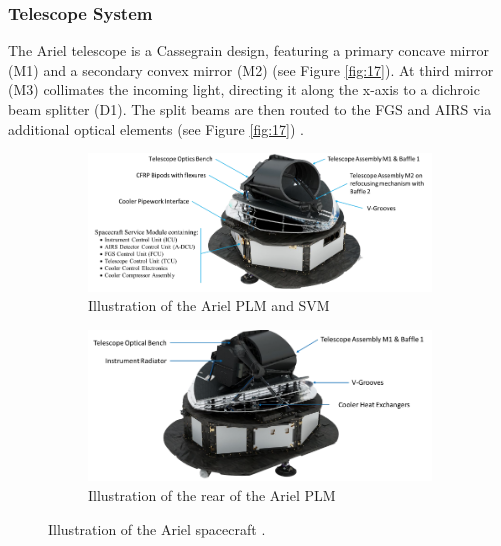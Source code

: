 \documentclass[12pt]{article}
\begin{document}
\subsubsection{Telescope System} \label{sec:4.2.2}

The Ariel telescope is a Cassegrain design, featuring a primary concave mirror (M1) and a secondary convex mirror (M2) (see Figure \ref{fig:17}). At third mirror (M3) collimates the incoming light, directing it along the x-axis to a dichroic beam splitter (D1).
The split beams are then routed to the FGS and AIRS via additional optical elements (see Figure \ref{fig:17}) \cite{ARIEL_M4_Proposal}.

\begin{figure}[hb]
    \centering
    \begin{subfigure}[b]{.49\textwidth}
        \centering
        \includegraphics[width=\linewidth]{ariel label1.png}
        \caption{Illustration of the Ariel PLM and SVM}
    \end{subfigure}
    \hfill
    \begin{subfigure}[b]{.49\textwidth}
        \centering
        \includegraphics[width=\linewidth]{ariel label2.png}
        \caption{Illustration of the rear of the Ariel PLM}
    \end{subfigure}
    \caption{Illustration of the Ariel spacecraft \protect\cite{salvignol2024ariel}.}
    \label{fig:18}
\end{figure}
\end{document}
